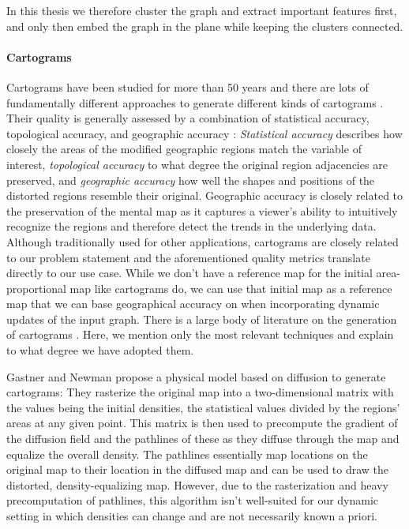 In this thesis we therefore cluster the graph and extract important features first, and only then embed the graph in the plane while keeping the clusters connected.


\paragraph{Cartograms}

Cartograms have been studied for more than 50 years \cite{tobler2004thirty} and there are lots of fundamentally different approaches to generate different kinds of cartograms \cite{nusrat2016state}.
Their quality is generally assessed by a combination of statistical accuracy, topological accuracy, and geographic accuracy \cite{alam2015quantitative}: \emph{Statistical accuracy} describes how closely the areas of the modified geographic regions match the variable of interest, \emph{topological accuracy} to what degree the original region adjacencies are preserved, and \emph{geographic accuracy} how well the shapes and positions of the distorted regions resemble their original.
Geographic accuracy is closely related to the preservation of the mental map as it captures a viewer's ability to intuitively recognize the regions and therefore detect the trends in the underlying data.
Although traditionally used for other applications, cartograms are closely related to our problem statement and the aforementioned quality metrics translate directly to our use case.
While we don't have a reference map for the initial area-proportional map like cartograms do, we can use that initial map as a reference map that we can base geographical accuracy on when incorporating dynamic updates of the input graph.
There is a large body of literature on the generation of cartograms \cite{tobler2004thirty} \cite{alam2015quantitative} \cite{nusrat2016state}.
Here, we mention only the most relevant techniques and explain to what degree we have adopted them.

Gastner and Newman \cite{gastner2004diffusion} propose a physical model based on diffusion to generate cartograms:
They rasterize the original map into a two-dimensional matrix with the values being the initial densities, \ie{} the statistical values divided by the regions' areas at any given point.
This matrix is then used to precompute the gradient of the diffusion field and the pathlines of these  as they diffuse through the map and equalize the overall density.
The pathlines essentially map locations on the original map to their location in the diffused map and can be used to draw the distorted, density-equalizing map.
However, due to the rasterization and heavy precomputation of pathlines, this algorithm isn't well-suited for our dynamic setting in which densities can change and are not necessarily known a priori.

